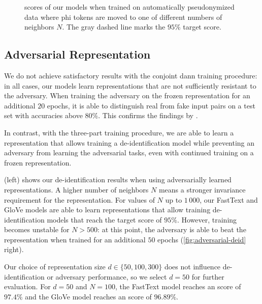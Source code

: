 \begin{figure}
    \centering
    
    \caption[De-identification with automatic pseudonymization]{%
        \fone scores of our models when trained on automatically pseudonymized data where \ac{phi} tokens are moved to one of different numbers of neighbors $N$.
        The gray dashed line marks the $95\%$ target \fone score.
}\label{fig:auto-pseudo}
\end{figure}

\subsection{Adversarial Representation}
%
We do not achieve satisfactory results with the conjoint \ac{dann} training procedure: in all cases, our models learn representations that are not sufficiently resistant to the adversary.
%
When training the adversary on the frozen representation for an additional $20$ epochs, it is able to distinguish real from fake input pairs on a test set with accuracies above $80\%$.
%
This confirms the findings by \citet{elazar2018adversarial}.

%
In contrast, with the three-part training procedure, we are able to learn a representation that allows training a de-identification model while preventing an adversary from learning the adversarial tasks, even with continued training on a frozen representation.

%
 (left) shows our de-identification results when using adversarially learned representations.
%
A higher number of neighbors $N$ means a stronger invariance requirement for the representation.
%
For values of $N$ up to $1\,000$, our FastText and GloVe models are able to learn representations that allow training de-identification models that reach the target \fone score of $95\%$.
%
However, training becomes unstable for $N>500$: at this point, the adversary is able to beat the representation when trained for an additional $50$ epochs (\cref{fig:adversarial-deid} right).

%
Our choice of representation size $d \in \{50, 100, 300\}$ does not influence de-identifi\-ca\-tion or adversary performance, so we select $d=50$ for further evaluation.
%
For $d=50$ and $N=100$, the FastText model reaches an \fone score of $97.4\%$ and the GloVe model reaches an \fone score of $96.89\%$.

\begin{figure*}
    \centering
    
    \caption[De-identification with adversarially learned representations]{%
        Left: de-identification \fone scores of our models using an adversarially trained representation with different numbers of neighbors $N$ for the representation invariance requirement.
        Right: mean adversary accuracy when trained on the frozen representation for an additional $50$ epochs.
    }\label{fig:adversarial-deid}
\end{figure*}

